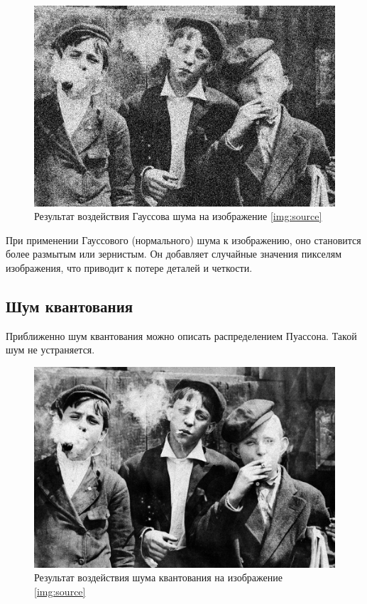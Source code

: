 \begin{figure}[ht!]
    \centering
    \includegraphics[width=\textwidth]{../Noisy_images/Gaussian_noise.jpg}
    \caption{Результат воздействия Гауссова шума на изображение \ref{img:source}}
    \label{img:gaussian_noise}
\end{figure}
\FloatBarrier

При применении Гауссового (нормального) шума к изображению, оно становится более размытым или зернистым. Он добавляет случайные значения пикселям изображения, что приводит к потере деталей и четкости.

\subsection{Шум квантования}
Приближенно шум квантования можно описать распределением Пуассона. Такой шум не устраняется.

\begin{figure}[ht!]
    \centering
    \includegraphics[width=\textwidth]{../Noisy_images/Poisson_Noise.jpg}
    \caption{Результат воздействия шума квантования на изображение \ref{img:source}}
    \label{img:poisson_noise}
\end{figure}
\FloatBarrier

